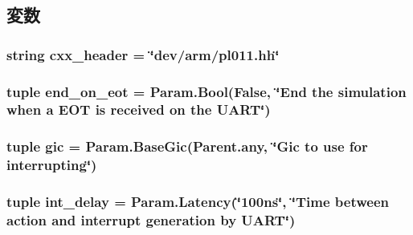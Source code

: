 \subsection{変数}
\hypertarget{classRealView_1_1Pl011_a17da7064bc5c518791f0c891eff05fda}{
\subsubsection[{cxx\_\-header}]{\setlength{\rightskip}{0pt plus 5cm}string {\bf cxx\_\-header} = \char`\"{}dev/arm/pl011.hh\char`\"{}}}
\label{classRealView_1_1Pl011_a17da7064bc5c518791f0c891eff05fda}
\hypertarget{classRealView_1_1Pl011_a8a06d20e8aa2c0d9c546230a08d059c7}{
\subsubsection[{end\_\-on\_\-eot}]{\setlength{\rightskip}{0pt plus 5cm}tuple {\bf end\_\-on\_\-eot} = Param.Bool(False, \char`\"{}End the simulation when a EOT is received on the UART\char`\"{})}}
\label{classRealView_1_1Pl011_a8a06d20e8aa2c0d9c546230a08d059c7}
\hypertarget{classRealView_1_1Pl011_a40243beb62d217c3a9e35801ae739fd0}{
\subsubsection[{gic}]{\setlength{\rightskip}{0pt plus 5cm}tuple {\bf gic} = Param.BaseGic(Parent.any, \char`\"{}Gic to use for interrupting\char`\"{})}}
\label{classRealView_1_1Pl011_a40243beb62d217c3a9e35801ae739fd0}
\hypertarget{classRealView_1_1Pl011_a849551e71f91ca939d22d4c083f4c731}{
\subsubsection[{int\_\-delay}]{\setlength{\rightskip}{0pt plus 5cm}tuple {\bf int\_\-delay} = Param.Latency(\char`\"{}100ns\char`\"{}, \char`\"{}Time between action and interrupt generation by UART\char`\"{})}}

